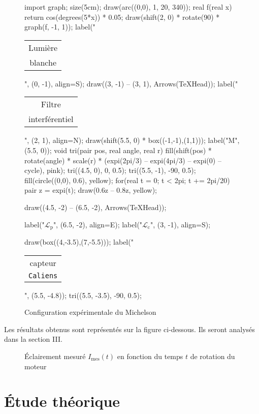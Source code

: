 \documentclass[a4paper,twocolumn,10pt,margin=0.5in]{extreport}
\begin{document}
	\begin{figure}[H]
		\centering
		\begin{asy}
			import graph;
			size(5cm);
			draw(arc((0,0), 1, 20, 340));
			real f(real x) { return cos(degrees(5*x)) * 0.05; }
			draw(shift(2, 0) * rotate(90) * graph(f, -1, 1));
			label("\begin{tabular}{c}Lumière\\blanche\end{tabular}", (0, -1), align=S);
			draw((3, -1) -- (3, 1), Arrows(TeXHead));
			label("\begin{tabular}{c}Filtre\\interférentiel\end{tabular}", (2, 1), align=N);
			draw(shift(5.5, 0) * box((-1,-1),(1,1)));
			label("M", (5.5, 0));
			void tri(pair pos, real angle, real r) {
				fill(shift(pos) * rotate(angle) * scale(r) * (expi(2pi/3) -- expi(4pi/3) -- expi(0) -- cycle), pink);
			}
			tri((4.5, 0), 0, 0.5);
			tri((5.5, -1), -90, 0.5);
			fill(circle((0,0), 0.6), yellow);
			for(real t = 0; t < 2pi; t += 2pi/20) {
				pair z = expi(t);
				draw(0.6z -- 0.8z, yellow);
			}

			draw((4.5, -2) -- (6.5, -2), Arrows(TeXHead));

			label("$\mathcal L_{\mathrm p}$", (6.5, -2), align=E);
			label("$\mathcal L_{\mathrm c}$", (3, -1), align=S);

			draw(box((4,-3.5),(7,-5.5)));
			label("\begin{tabular}{c}capteur\\\texttt{Caliens}\end{tabular}", (5.5, -4.8));
			tri((5.5, -3.5), -90, 0.5);
		\end{asy}
		\caption{Configuration expérimentale du Michelson}
	\end{figure}

	Les résultats obtenus sont représentés sur la figure ci-dessous. Ils seront analysés dans la section III.

	\begin{figure}[H]
		\centering
		\resizebox{\linewidth}{!}{}
		\caption{Éclairement mesuré $I_\mathrm{mes}(t)$ en fonction du temps $t$ de rotation du moteur}
	\end{figure}

	\section{Étude théorique}
\end{document}
